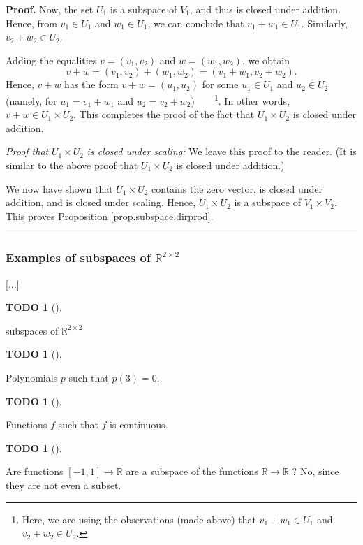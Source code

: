 \documentclass[numbers=enddot,12pt,final,onecolumn,notitlepage]{scrartcl}%
\theoremstyle{definition}
\newtheorem{quest}[theo]{TODO}
\newenvironment{todo}[1][]
{\begin{quest}[#1]\begin{leftbar}}
{\end{leftbar}\end{quest}}
\newenvironment{proof}[1][Proof]{\noindent\textbf{#1.} }{\ \rule{0.5em}{0.5em}}
\begin{document}
\begin{proof}
Now, the set $U_{1}$ is a subspace of $V_{1}$, and thus is closed under
addition. Hence, from $v_{1}\in U_{1}$ and $w_{1}\in U_{1}$, we can conclude
that $v_{1}+w_{1}\in U_{1}$. Similarly, $v_{2}+w_{2}\in U_{2}$.

Adding the equalities $v=\left(  v_{1},v_{2}\right)  $ and $w=\left(
w_{1},w_{2}\right)  $, we obtain%
\[
v+w=\left(  v_{1},v_{2}\right)  +\left(  w_{1},w_{2}\right)  =\left(
v_{1}+w_{1},v_{2}+w_{2}\right)  .
\]
Hence, $v+w$ has the form $v+w=\left(  u_{1},u_{2}\right)  $ for some
$u_{1}\in U_{1}$ and $u_{2}\in U_{2}$ (namely, for $u_{1}=v_{1}+w_{1}$ and
$u_{2}=v_{2}+w_{2}$)\ \ \ \ \footnote{Here, we are using the observations
(made above) that $v_{1}+w_{1}\in U_{1}$ and $v_{2}+w_{2}\in U_{2}$.}. In
other words, $v+w\in U_{1}\times U_{2}$. This completes the proof of the fact
that $U_{1}\times U_{2}$ is closed under addition.

\textit{Proof that }$U_{1}\times U_{2}$ \textit{is closed under scaling:} We
leave this proof to the reader. (It is similar to the above proof that
$U_{1}\times U_{2}$ is closed under addition.)

We now have shown that $U_{1}\times U_{2}$ contains the zero vector, is closed
under addition, and is closed under scaling. Hence, $U_{1}\times U_{2}$ is a
subspace of $V_{1}\times V_{2}$. This proves Proposition
\ref{prop.subspace.dirprod}.
\end{proof}

\subsubsection{Examples of subspaces of $\mathbb{R}^{2\times2}$}

[...]

\begin{todo}
subspaces of $\mathbb{R}^{2\times2}$
\end{todo}

\begin{todo}
Polynomials $p$ such that $p\left(  3\right)  =0$.
\end{todo}

\begin{todo}
Functions $f$ such that $f$ is continuous.
\end{todo}

\begin{todo}
Are functions $\left[  -1,1\right]  \rightarrow\mathbb{R}$ are a subspace of
the functions $\mathbb{R}\rightarrow\mathbb{R}$ ? No, since they are not even
a subset.
\end{todo}
\end{document}
